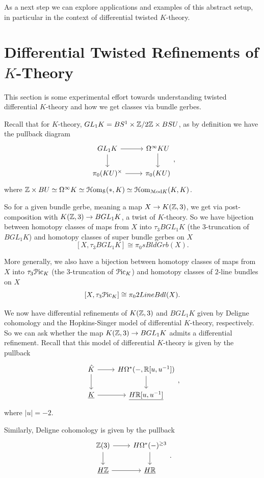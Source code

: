 \documentclass[10pt]{amsart}
\begin{document}
As a next step we can explore applications and examples of this abstract setup, in particular in the context of differential twisted $K$-theory.

\section{Differential Twisted Refinements of \texorpdfstring{$K$}{K}-Theory}
This section is some experimental effort towards understanding twisted differential $K$-theory and how we get classes via bundle gerbes.

Recall that for $K$-theory, $GL_1K = BS^1 \times \mathbb{Z}/2\mathbb{Z} \times BSU$, as by definition we have the pullback diagram 
\[ 
\begin{tikzcd}
 GL_1K \arrow[r] \arrow[d] & \Omega^\infty KU \arrow[d] \\
 \pi_0(KU)^\times \arrow[r] & \pi_0(KU)
\end{tikzcd},
\]
where $\mathbb{Z} \times BU \simeq \Omega^\infty K \simeq \mathcal{H}\mathrm{om}_{\mathcal{S}}(*, K) \simeq \mathcal{H}\mathrm{om}_{\mathcal{M}\mathrm{od} K}(K,K)$.

So for a given bundle gerbe, meaning a map $X \to K(\mathbb{Z},3)$, we get via post-composition with $K(\mathbb{Z},3) \to BGL_1K$, a twist of $K$-theory. So we have bijection between homotopy classes of maps from $X$ into $\tau_3 BGL_1 K$ (the $3$-truncation of $BGL_1K$) and homotopy classes of super bundle gerbes on $X$
\[[X, \tau_3 BGL_1 K] \cong \pi_0 sBldGrb(X).\]

More generally, we also have a bijection between homotopy classes of maps from $X$ into $\tau_3\mathcal{P}\mathrm{ic}_K$ (the $3$-truncation of $\mathcal{P}\mathrm{ic}_K$) and homotopy classes of $2$-line bundles on $X$
\[[X, \tau_3\mathcal{P}\mathrm{ic}_K] \cong \pi_0 2LineBdl(X).\]

We now have differential refinements of $K(\mathbb{Z},3)$ and $BGL_1K$ given by Deligne cohomology and the Hopkins-Singer model of differential $K$-theory, respectively. So we can ask whether the map $K(\mathbb{Z},3) \to BGL_1K$ admits a differential refinement. Recall that this model of differential $K$-theory is given by the pullback
\[ 
\begin{tikzcd}
 \hat{K} \arrow[r] \arrow[d] & H\Omega^*(-, \bR[u,u^{-1}]) \arrow[d] \\
 \underline{K} \arrow[r] & \underline{H\bR[u,u^{-1}]} 
\end{tikzcd},
\]
where $|u| = -2$.

Similarly, Deligne cohomology is given by the pullback
\[
\begin{tikzcd}
 \bZ(3) \arrow[r] \arrow[d] & H\Omega^*(-)^{\geq 3} \arrow[d] \\
 \underline{H\bZ} \arrow[r] & \underline{H\bR} 
\end{tikzcd}.
\]
\end{document}

